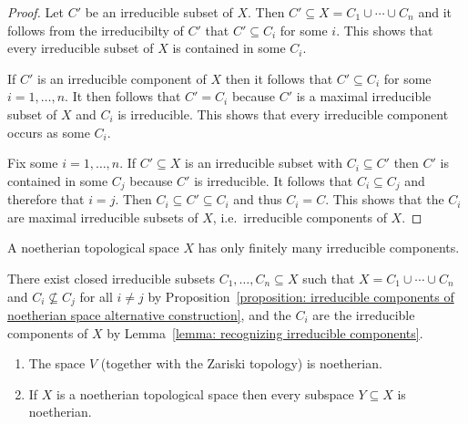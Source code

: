 \begin{proof}
  Let $C'$ be an irreducible subset of $X$.
  Then $C' \subseteq X = C_1 \cup \dotsb \cup C_n$ and it follows from the irreducibilty of $C'$ that $C' \subseteq C_i$ for some $i$.
  This shows that every irreducible subset of $X$ is contained in some $C_i$.
  
  If $C'$ is an irreducible component of $X$ then it follows that $C' \subseteq C_i$ for some $i = 1, \dotsc, n$.
  It then follows that $C' = C_i$ because $C'$ is a maximal irreducible subset of $X$ and $C_i$ is irreducible.
  This shows that every irreducible component occurs as some $C_i$.
  
  Fix some $i = 1, \dotsc, n$.
  If $C' \subseteq X$ is an irreducible subset with $C_i \subseteq C'$ then $C'$ is contained in some $C_j$ because $C'$ is irreducible.
  It follows that $C_i \subseteq C_j$ and therefore that $i = j$.
  Then $C_i \subseteq C' \subseteq C_i$ and thus $C_i = C$.
  This shows that the $C_i$ are maximal irreducible subsets of $X$, i.e.\ irreducible components of $X$.
\end{proof}


\begin{corollary}
  \label{corollary: noetherian spaces have only finitely many irreducible components}
  A noetherian topological space $X$ has only finitely many irreducible components.
\end{corollary}


\begin{corollary}
  There exist closed irreducible subsets $C_1, \dotsc, C_n \subseteq X$ such that $X = C_1 \cup \dotsb \cup C_n$ and $C_i \nsubseteq C_j$ for all $i \neq j$ by Proposition~\ref{proposition: irreducible components of noetherian space alternative construction}, and the $C_i$ are the irreducible components of $X$ by Lemma~\ref{lemma: recognizing irreducible components}.
\end{corollary}


\begin{lemma}
  \label{lemma: algebraic spaces are noetherian}
  \leavevmode
  \begin{enumerate}
    \item
      The space $V$ (together with the Zariski topology) is noetherian.
    \item
      If $X$ is a noetherian topological space then every subspace $Y \subseteq X$ is noetherian.
  \end{enumerate}
\end{lemma}


